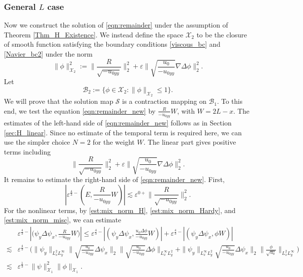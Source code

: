 \documentclass[reqno, 11pt]{amsart}
\theoremstyle{plain}
\theoremstyle{definition}
\theoremstyle{remark}
\numberwithin{equation}{section}
\newcommand\cB{\mathcal{B}}
\newcommand\cS{\mathcal{S}}
\newcommand\cX{\mathcal{X}}
\begin{document}
\subsubsection{General $L$ case}
Now we construct the solution of \eqref{eqn:remainder} under the assumption of Theorem \ref{Thm_H_Existence}. We instead define the space $\cX_2$ to be the closure of smooth function satisfying the boundary conditions \eqref{viscous_bc} and \eqref{Navier_bc2} under the norm
$$
\| \phi \|_{\cX_2}^2:=    \|\frac{R}{\sqrt{-u_{0yy}}}\|_{2}^2 + \varepsilon   \| \sqrt{\frac{u_0}{-u_{0yy}}} \nabla \Delta \phi \|_{2}^2.
$$
Let 
$$
\cB_2 := \{ \phi \in \cX_2 : \| \phi \|_{\cX_2} \le 1 \}.
$$
We will prove that the solution map $\cS$ is a contraction mapping on $\cB_1$. To this end, we test the equation \eqref{eqn:remainder_new} by $\frac{R}{-u_{0yy}} W$, with $W = 2L - x$. The estimates of the left-hand side of \eqref{eqn:remainder_new} follows  as in Section \ref{sec:H_linear}. Since no estimate of the temporal term is required here, we can use the simpler choice $N=2$ for the weight $W$. The linear part gives positive terms including
\begin{equation}\label{pos_2}
 \|\frac{R}{\sqrt{-u_{0yy}}}\|_{2}^2 + \varepsilon  \| \sqrt{\frac{u_0}{-u_{0yy}}} \nabla \Delta \phi \|_{2}^2.
\end{equation}
It remains to estimate the right-hand side of \eqref{eqn:remainder_new}. First,
\begin{equation}\label{cons_3}
|\varepsilon^{\frac{4}{3}-}(E, \frac{R}{-u_{0yy}} W)| \lesssim \varepsilon^{0+}  \|\frac{R}{\sqrt{-u_{0yy}}}\|_{2}^2.
\end{equation}
For the nonlinear terms, by  \eqref{est:mix_norm_H}, \eqref{est:mix_norm_Hardy}, and \eqref{est:mix_norm_misc}, we can estimate
\begin{equation}\label{cons_4}
\begin{aligned}
&\varepsilon^{\frac{4}{3}-} |\Big(\psi_y \Delta \psi_x, \frac{R}{-u_{0yy}} W \Big)|
 \le \varepsilon^{\frac{4}{3}-} |(\psi_y \Delta \psi_x, \frac{u_0 \Delta \phi}{-u_{0yy}}W)| + \varepsilon^{\frac{4}{3}-} |(\psi_y \Delta \psi_x, \phi W)|\\ 
\lesssim&  \varepsilon^{\frac{4}{3}-}\Big( \| \psi_y\|_{L^2_x L^\infty_y} \| \sqrt{\frac{u_0}{-u_{0yy}}}\Delta \psi_x\|_2 \| \sqrt{\frac{u_0}{-u_{0yy}}}\Delta \phi\|_{L^\infty_x L^2_y} +  \| \psi_y\|_{L^\infty_x L^2_y}\sqrt{\frac{u_0}{-u_{0yy}}}\Delta \psi_x\|_2 \| \frac{\phi}{\sqrt{u_0}}\|_{L^2_x L^\infty_y} \Big)\\
\lesssim &\varepsilon^{\frac{1}{3}-} \| \psi \|_{\cX_1}^2 \| \phi\|_{\cX_1}.
\end{aligned}
\end{equation}
\end{document}
